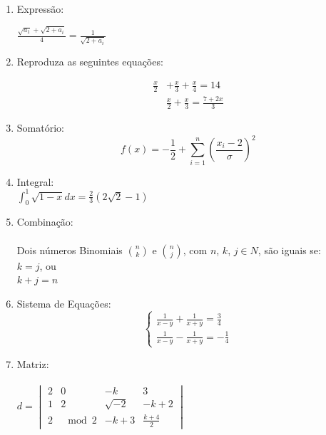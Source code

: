 \documentclass[13pt]{article}
\begin{document}
\begin{enumerate}
\item Expressão:

$\frac{\sqrt{a_1} + \sqrt{2 + a_i}}{4} = \frac{1}{\sqrt{2+a_i}}$

\item Reproduza as seguintes equações:

\begin{equation}\label{xx}
\begin{split}
\frac{x}{2} &   + \frac{x}{3} + \frac{x}{4} = 14 \\ 
&  \frac{x}{2} + \frac{x}{3} = \frac{7+2x}{3}
\end{split}
\end{equation}

\item Somatório:
$$ f(x) = -\frac{1}{2} +  \sum_{i=1}^{n}\left(\frac{x_i - 2}{\sigma}\right)^2$$

\item Integral: \\
$\int_{0}^{1} \sqrt{1-x}dx = \frac{2}{3}(2\sqrt{2}-1)$

\item Combinação: \\ \\
Dois números Binomiais ${n \choose k}$ e ${n \choose j}$, com $n$, $k$, $j \in N$, são iguais se: \\
$k = j$, ou \\
$k + j = n$

\item Sistema de Equações:
$$
\begin{cases}
\frac{1}{x-y} + \frac{1}{x+y} = \frac{3}{4}\\
\frac{1}{x-y} - \frac{1}{x+y} = -\frac{1}{4}
\end{cases}
$$

\item Matriz:\\ \\
$
d= \begin{vmatrix}
2 & 0 & -k & 3 \\
1 & 2 & \sqrt{-2} & -k+2 \\
2 & \mod{2} & -k+3 & \frac{k+4}{2}
\end{vmatrix}
$

\end{enumerate}
\end{document}
